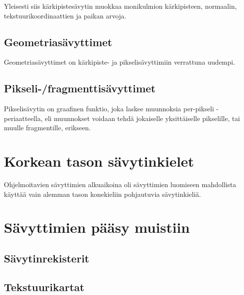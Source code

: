 \documentclass[finnish]{tktltiki2}
\theoremstyle{definition}
\theoremstyle{remark}
\begin{document}
Yleisesti siis kärkipistesävytin muokkaa monikulmion kärkipisteen, normaalin, tekstuurikoordinaattien ja paikan arvoja.

\subsection{Geometriasävyttimet}

Geometriasävyttimet on kärkipiste- ja pikselisävyttimiin verrattuna uudempi.

\subsection{Pikseli-/fragmenttisävyttimet}

Pikselisävytin on graafinen funktio, joka laskee muunnoksia per-pikseli -periaatteella, eli muunnokset voidaan tehdä jokaiselle yksittäiselle pikselille, tai muulle fragmentille, erikseen. 

\section{Korkean tason sävytinkielet}

Ohjelmoitavien sävyttimien alkuaikoina oli sävyttimien luomiseen mahdollista käyttää vain alemman tason konekieliin pohjautuvia sävytinkieliä.

\section{Sävyttimien pääsy muistiin}
\subsection{Sävytinrekisterit}
\subsection{Tekstuurikartat}


%
%
% 
%







% 
\end{document}
